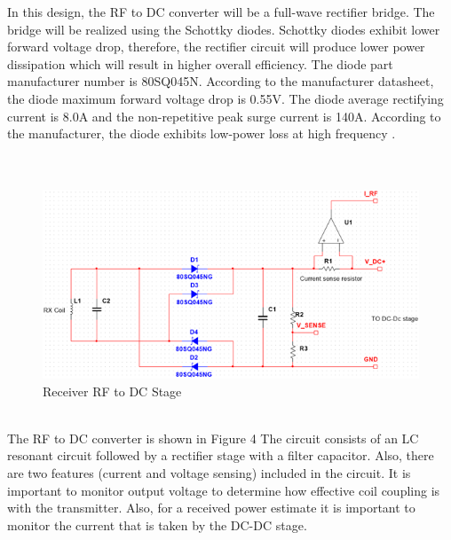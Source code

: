 \documentclass[12pt]{article}
\begin{document}
\indent
In this design, the RF to DC converter will be a full-wave rectifier bridge. The bridge will be realized using the Schottky diodes. Schottky diodes exhibit lower forward voltage drop, therefore, the rectifier circuit will produce lower power dissipation which will result in higher overall efficiency. The diode part manufacturer number is 80SQ045N. According to the manufacturer datasheet, the diode maximum forward voltage drop is 0.55V. The diode average rectifying current is 8.0A and the non-repetitive peak surge current is 140A. According to the manufacturer, the diode exhibits low-power loss at high frequency \cite{80SQ045N}.\\
\hfill \\
\pagebreak
\hfill \\
\hfill
\begin{figure}[h!]
\centering
\includegraphics[width=0.9\linewidth]{sim_rfdc_stage}
\caption{Receiver RF to DC Stage}
\end{figure}
\hfill \\
\indent
The RF to DC converter is shown in Figure 4 The circuit consists of an LC resonant circuit followed by a rectifier stage with a filter capacitor. Also, there are two features (current and voltage sensing) included in the circuit. It is important to monitor output voltage to determine how effective coil coupling is with the transmitter. Also, for a received power estimate it is important to monitor the current that is taken by the DC-DC stage.\\
\end{document}
